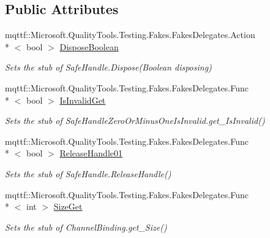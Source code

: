 \subsection*{Public Attributes}
\begin{DoxyCompactItemize}
\item 
mqttf\-::\-Microsoft.\-Quality\-Tools.\-Testing.\-Fakes.\-Fakes\-Delegates.\-Action\\*
$<$ bool $>$ \hyperlink{class_system_1_1_security_1_1_authentication_1_1_extended_protection_1_1_fakes_1_1_stub_channel_binding_aa0e656be070cc70476d7fe39b9df0a22}{Dispose\-Boolean}
\begin{DoxyCompactList}\small\item\em Sets the stub of Safe\-Handle.\-Dispose(\-Boolean disposing)\end{DoxyCompactList}\item 
mqttf\-::\-Microsoft.\-Quality\-Tools.\-Testing.\-Fakes.\-Fakes\-Delegates.\-Func\\*
$<$ bool $>$ \hyperlink{class_system_1_1_security_1_1_authentication_1_1_extended_protection_1_1_fakes_1_1_stub_channel_binding_a95620c407b8a212461bb441aedfd64ac}{Is\-Invalid\-Get}
\begin{DoxyCompactList}\small\item\em Sets the stub of Safe\-Handle\-Zero\-Or\-Minus\-One\-Is\-Invalid.\-get\-\_\-\-Is\-Invalid()\end{DoxyCompactList}\item 
mqttf\-::\-Microsoft.\-Quality\-Tools.\-Testing.\-Fakes.\-Fakes\-Delegates.\-Func\\*
$<$ bool $>$ \hyperlink{class_system_1_1_security_1_1_authentication_1_1_extended_protection_1_1_fakes_1_1_stub_channel_binding_af54cb91ce589053eff871faa7a4b7e72}{Release\-Handle01}
\begin{DoxyCompactList}\small\item\em Sets the stub of Safe\-Handle.\-Release\-Handle()\end{DoxyCompactList}\item 
mqttf\-::\-Microsoft.\-Quality\-Tools.\-Testing.\-Fakes.\-Fakes\-Delegates.\-Func\\*
$<$ int $>$ \hyperlink{class_system_1_1_security_1_1_authentication_1_1_extended_protection_1_1_fakes_1_1_stub_channel_binding_a65a39f1dd1d8a1fd4589912cdef60bde}{Size\-Get}
\begin{DoxyCompactList}\small\item\em Sets the stub of Channel\-Binding.\-get\-\_\-\-Size()\end{DoxyCompactList}\end{DoxyCompactItemize}
